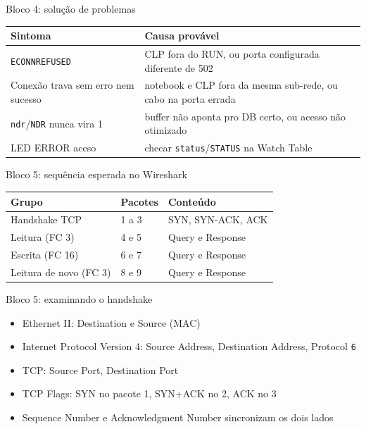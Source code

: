 \documentclass[12pt, aspectratio=169]{beamer}
\newcommand{\tblhead}[1]{\textcolor{TextPrimary}{\textbf{#1}}}
\begin{document}
\begin{frame}{Bloco 4: solução de problemas}
  \begin{tabularx}{\textwidth}{@{}X X@{}}
    \rowcolor{PanelEdge}
    \tblhead{Sintoma} & \tblhead{Causa provável} \\
    \midrule
    \rowcolor{PanelBg}
    \texttt{ECONNREFUSED} & CLP fora do RUN, ou porta configurada diferente de 502 \\
    \rowcolor{PanelBg}
    Conexão trava sem erro nem sucesso & notebook e CLP fora da mesma sub-rede, ou cabo na porta errada \\
    \rowcolor{PanelBg}
    \texttt{ndr}/\texttt{NDR} nunca vira 1 & buffer não aponta pro DB certo, ou acesso não otimizado \\
    \rowcolor{PanelBg}
    LED ERROR aceso & checar \texttt{status}/\texttt{STATUS} na Watch Table \\
  \end{tabularx}
\end{frame}

\begin{frame}{Bloco 5: sequência esperada no Wireshark}
  \vspace{0.3cm}
  \small
  \begin{tabularx}{\textwidth}{@{}l l X@{}}
    \rowcolor{PanelEdge}
    \tblhead{Grupo} & \tblhead{Pacotes} & \tblhead{Conteúdo} \\
    \midrule
    \rowcolor{PanelBg}
    Handshake TCP & 1 a 3 & SYN, SYN-ACK, ACK \\
    \rowcolor{PanelBg}
    Leitura (FC 3) & 4 e 5 & Query e Response \\
    \rowcolor{PanelBg}
    Escrita (FC 16) & 6 e 7 & Query e Response \\
    \rowcolor{PanelBg}
    Leitura de novo (FC 3) & 8 e 9 & Query e Response \\
  \end{tabularx}
\end{frame}

\begin{frame}{Bloco 5: examinando o handshake}
  \vspace{0.4cm}
  \begin{itemize}
    \item Ethernet II: Destination e Source (MAC)
    \item Internet Protocol Version 4: Source Address, Destination Address, Protocol \texttt{6}
    \item TCP: Source Port, Destination Port
    \item TCP Flags: SYN no pacote 1, SYN+ACK no 2, ACK no 3
    \item Sequence Number e Acknowledgment Number sincronizam os dois lados
  \end{itemize}
\end{frame}
\end{document}
